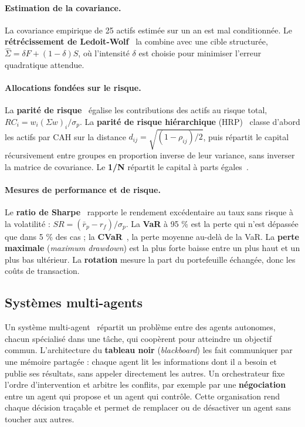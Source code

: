 \paragraph{Estimation de la covariance.} La covariance empirique de 25 actifs estimée sur un an est mal conditionnée. Le \textbf{rétrécissement de Ledoit-Wolf}~\cite{ledoit2004} la combine avec une cible structurée, $\hat\Sigma = \delta F + (1-\delta) S$, où l'intensité $\delta$ est choisie pour minimiser l'erreur quadratique attendue.

\paragraph{Allocations fondées sur le risque.} La \textbf{parité de risque}~\cite{maillard2010} égalise les contributions des actifs au risque total, $RC_i = w_i (\Sigma w)_i / \sigma_p$. La \textbf{parité de risque hiérarchique} (HRP)~\cite{lopezdeprado2016} classe d'abord les actifs par CAH sur la distance $d_{ij} = \sqrt{(1-\rho_{ij})/2}$, puis répartit le capital récursivement entre groupes en proportion inverse de leur variance, sans inverser la matrice de covariance. Le \textbf{1/N} répartit le capital à parts égales~\cite{demiguel2009}.

\paragraph{Mesures de performance et de risque.} Le \textbf{ratio de Sharpe}~\cite{sharpe1966} rapporte le rendement excédentaire au taux sans risque à la volatilité : $SR = (\bar r_p - r_f)/\sigma_p$. La \textbf{VaR} à 95 \% est la perte qui n'est dépassée que dans 5 \% des cas ; la \textbf{CVaR}~\cite{rockafellar2000}, la perte moyenne au-delà de la VaR. La \textbf{perte maximale} (\emph{maximum drawdown}) est la plus forte baisse entre un plus haut et un plus bas ultérieur. La \textbf{rotation} mesure la part du portefeuille échangée, donc les coûts de transaction.

\subsection{Systèmes multi-agents}

Un système multi-agent~\cite{wooldridge2009} répartit un problème entre des agents autonomes, chacun spécialisé dans une tâche, qui coopèrent pour atteindre un objectif commun. L'architecture du \textbf{tableau noir} (\emph{blackboard}) les fait communiquer par une mémoire partagée : chaque agent lit les informations dont il a besoin et publie ses résultats, sans appeler directement les autres. Un orchestrateur fixe l'ordre d'intervention et arbitre les conflits, par exemple par une \textbf{négociation} entre un agent qui propose et un agent qui contrôle. Cette organisation rend chaque décision traçable et permet de remplacer ou de désactiver un agent sans toucher aux autres.
